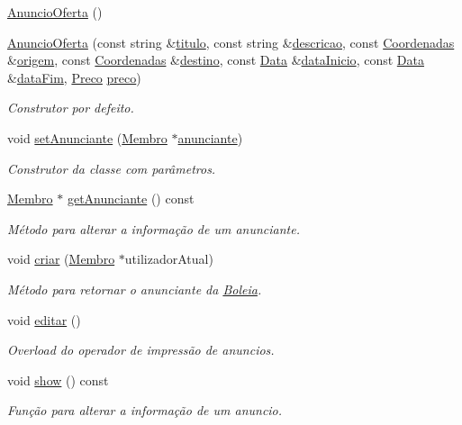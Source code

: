 \begin{DoxyCompactItemize}
\item 
\hyperlink{class_anuncio_oferta_a5828e85f76169ec6b3a5b51fabe42d1c}{Anuncio\+Oferta} ()
\item 
\hyperlink{class_anuncio_oferta_a1bc1fd4199b766b00e7234385732720f}{Anuncio\+Oferta} (const string \&\hyperlink{class_anuncio_adb34bedd8220f42b9ee37662c21313e6}{titulo}, const string \&\hyperlink{class_anuncio_aa6a9eb8d08cb06d16061b006eb2c8b97}{descricao}, const \hyperlink{class_coordenadas}{Coordenadas} \&\hyperlink{class_anuncio_a9b3f8ac29ebf2a44e24ea2273064a7f5}{origem}, const \hyperlink{class_coordenadas}{Coordenadas} \&\hyperlink{class_anuncio_acdac86595f84cfb8a2bf54c414857168}{destino}, const \hyperlink{class_data}{Data} \&\hyperlink{class_anuncio_abeb7d8c5fe5e7d127005044981a3cd3d}{data\+Inicio}, const \hyperlink{class_data}{Data} \&\hyperlink{class_anuncio_ac3b9182cc541cb68215f8aa09fb0e11a}{data\+Fim}, \hyperlink{class_preco}{Preco} \hyperlink{class_anuncio_aa780fd8e07586a3af117fd20593fb1b4}{preco})
\begin{DoxyCompactList}\small\item\em Construtor por defeito. \end{DoxyCompactList}\item 
void \hyperlink{class_anuncio_oferta_a2bb132a1679d5a51edf54ac823bb9c4e}{set\+Anunciante} (\hyperlink{class_membro}{Membro} $\ast$\hyperlink{class_anuncio_a58250bfc8ab82d4308839b1e26213a0f}{anunciante})
\begin{DoxyCompactList}\small\item\em Construtor da classe com parâmetros. \end{DoxyCompactList}\item 
\hyperlink{class_membro}{Membro} $\ast$ \hyperlink{class_anuncio_oferta_a517173f7de8f7952e402e58b8b5d19b9}{get\+Anunciante} () const 
\begin{DoxyCompactList}\small\item\em Método para alterar a informação de um anunciante. \end{DoxyCompactList}\item 
void \hyperlink{class_anuncio_oferta_a796d66969f1f391fc62685ad8e6c81cb}{criar} (\hyperlink{class_membro}{Membro} $\ast$utilizador\+Atual)
\begin{DoxyCompactList}\small\item\em Método para retornar o anunciante da \hyperlink{class_boleia}{Boleia}. \end{DoxyCompactList}\item 
void \hyperlink{class_anuncio_oferta_a802538a48708716a4eef52823642c9d8}{editar} ()
\begin{DoxyCompactList}\small\item\em Overload do operador de impressão de anuncios. \end{DoxyCompactList}\item 
void \hyperlink{class_anuncio_oferta_a046a87a9ba9b1fedb071a6c5ba09663c}{show} () const 
\begin{DoxyCompactList}\small\item\em Função para alterar a informação de um anuncio. \end{DoxyCompactList}\end{DoxyCompactItemize}
